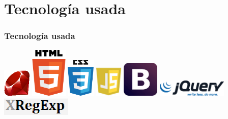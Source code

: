 \documentclass{beamer}
\begin{document}

\section{Tecnología usada}
\begin{frame}
  \frametitle{Tecnología usada}
  
  \includegraphics[width=0.1\textwidth]{img/ruby.eps}
  \hspace*{1.2cm}
  \includegraphics[width=0.13\textwidth]{img/HTML5.eps}
  \hspace*{1.2cm}
  \includegraphics[width=0.1\textwidth]{img/css3.eps}
  \hspace*{1.2cm}
  \includegraphics[width=0.1\textwidth]{img/js.eps}
  \hspace*{1.2cm}
  \includegraphics[width=0.13\textwidth]{img/bootstrap.eps}
  \newline
  \newline
  \includegraphics[width=0.25\textwidth]{img/jquery.eps}
  \hspace*{1.2cm}
  \includegraphics[width=0.25\textwidth]{img/xregexp.eps}

\end{frame}
\end{document}
